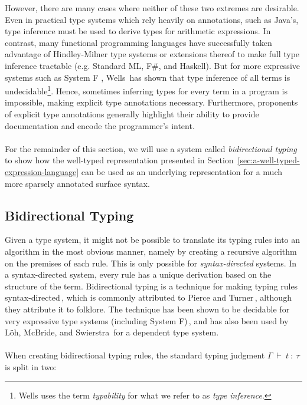 However, there are many cases where neither of these two extremes are desirable. Even in practical type systems which rely heavily on annotations, such as Java's, type inference must be used to derive types for arithmetic expressions. In contrast, many functional programming languages have successfully taken advantage of Hindley-Milner  type systems or extensions thereof to make full type inference tractable (e.g. Standard ML, F\#, and Haskell). But for more expressive systems such as System F , Wells\,\cite{Wells96typability} has shown that type inference of all terms is undecidable\footnote{Wells uses the term \emph{typability} for what we refer to as \emph{type inference}.}. Hence, sometimes inferring types for every term in a program is impossible, making explicit type annotations necessary. Furthermore, proponents of explicit type annotations generally highlight their ability to provide documentation and encode the programmer's intent.
\paragraph{}
For the remainder of this section, we will use a system called \emph{bidirectional typing} to show how the well-typed representation presented in Section~\ref{sec:a-well-typed-expression-language} can be used as an underlying representation for a much more sparsely annotated surface syntax.

\subsection{Bidirectional Typing}
Given a type system, it might not be possible to translate its typing rules into an algorithm in the most obvious manner, namely by creating a recursive algorithm on the premises of each rule. This is only possible for \emph{syntax-directed} systems. In a syntax-directed system, every rule has a unique derivation based on the structure of the term. Bidirectional typing is a technique for making typing rules syntax-directed\,\cite{Christiansen:bidirectional}, which is commonly attributed to Pierce and Turner\,\cite{Pierce:2000}, although they attribute it to folklore. The technique has been shown to be decidable for very expressive type systems (including System F)\,\cite{Dunfield13:bidir}, and has also been used by L\"{o}h, McBride, and Swierstra\,\cite{Loh:2010} for a dependent type system.

\paragraph{}
When creating bidirectional typing rules, the standard typing judgment $\Gamma~\vdash~t~:~\tau$ is split in two:

